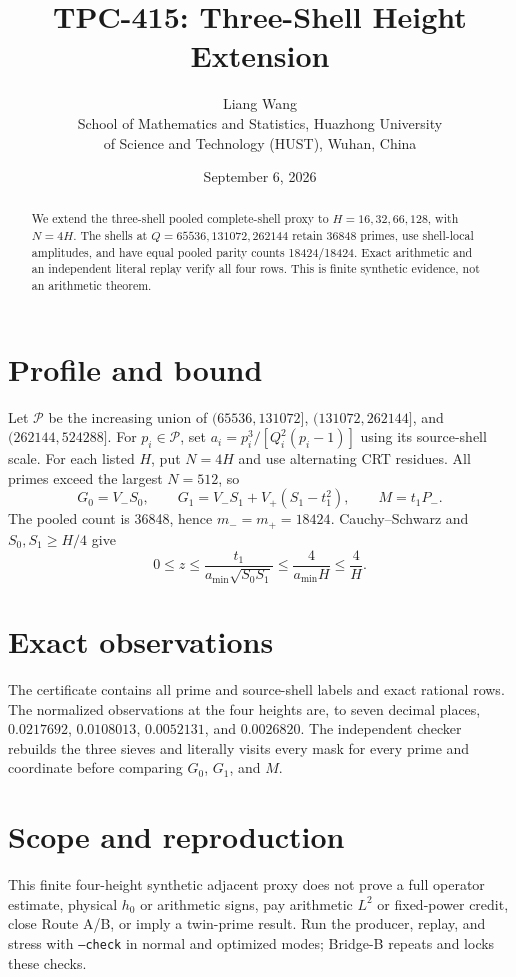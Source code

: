 \documentclass[11pt]{article}
\title{TPC-415: Three-Shell Height Extension}
\author{Liang Wang\\School of Mathematics and Statistics, Huazhong University\\of Science and Technology (HUST), Wuhan, China}
\date{September 6, 2026}
\begin{document}
\maketitle
\begin{abstract}
We extend the three-shell pooled complete-shell proxy to $H=16,32,66,128$,
with $N=4H$.  The shells at $Q=65536,131072,262144$ retain 36848 primes,
use shell-local amplitudes, and have equal pooled parity counts 18424/18424.
Exact arithmetic and an independent literal replay verify all four rows.  This
is finite synthetic evidence, not an arithmetic theorem.
\end{abstract}
\section{Profile and bound}
Let $\mathcal P$ be the increasing union of $(65536,131072]$,
$(131072,262144]$, and $(262144,524288]$.  For $p_i\in\mathcal P$, set
$a_i=p_i^3/[Q_i^2(p_i-1)]$ using its source-shell scale.  For each listed $H$,
put $N=4H$ and use alternating CRT residues.  All primes exceed the largest
$N=512$, so
\[
G_0=V_-S_0,\qquad G_1=V_-S_1+V_+(S_1-t_1^2),\qquad M=t_1P_-.
\]
The pooled count is 36848, hence $m_-=m_+=18424$.  Cauchy--Schwarz and
$S_0,S_1\ge H/4$ give
\[
0\le z\le\frac{t_1}{a_{\min}\sqrt{S_0S_1}}\le\frac4{a_{\min}H}\le\frac4H.\tag{1}
\]
\section{Exact observations}
The certificate contains all prime and source-shell labels and exact rational
rows.  The normalized observations at the four heights are, to seven decimal
places, $0.0217692$, $0.0108013$, $0.0052131$, and $0.0026820$.
The independent checker rebuilds the three sieves and literally visits every
mask for every prime and coordinate before comparing $G_0$, $G_1$, and $M$.
\section{Scope and reproduction}
This finite four-height synthetic adjacent proxy does not prove a full operator
estimate, physical $h_0$ or arithmetic signs, pay arithmetic $L^2$ or fixed-power
credit, close Route A/B, or imply a twin-prime result.  Run the producer, replay,
and stress with \texttt{--check} in normal and optimized modes; Bridge-B repeats
and locks these checks.
\end{document}
